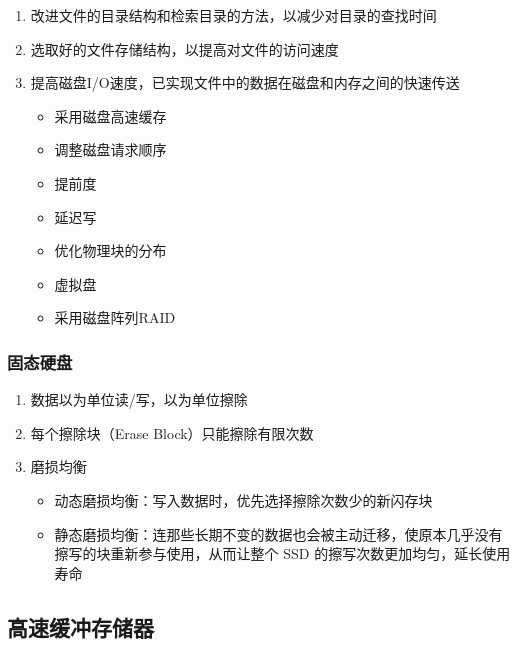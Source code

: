 \documentclass[./computer-organization-and-architecture.tex]{subfiles}
\begin{document}
    \begin{enumerate}
        \item 改进文件的目录结构和检索目录的方法，以减少对目录的查找时间
        \item 选取好的文件存储结构，以提高对文件的访问速度
        \item 提高磁盘I/O速度，已实现文件中的数据在磁盘和内存之间的快速传送
        \begin{itemize}
            \item 采用磁盘高速缓存
            \item 调整磁盘请求顺序
            \item 提前度
            \item 延迟写
            \item 优化物理块的分布
            \item 虚拟盘
            \item 采用磁盘阵列RAID
        \end{itemize}
    \end{enumerate}

    \subsubsection{固态硬盘}

    \begin{enumerate}
        \item 数据以{\color{red}{页}}为单位读/写，以{\color{red}{块}}为单位擦除
        \item 每个擦除块（Erase Block）只能擦除有限次数
        \item 磨损均衡
        \begin{itemize}
            \item 动态磨损均衡：写入数据时，优先选择擦除次数少的新闪存块
            \item 静态磨损均衡：连那些长期不变的数据也会被主动迁移，使原本几乎没有擦写的块重新参与使用，从而让整个 SSD 的擦写次数更加均匀，延长使用寿命
        \end{itemize}
    \end{enumerate}

    \subsection{高速缓冲存储器}
\end{document}
